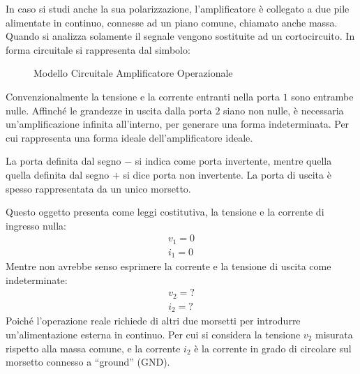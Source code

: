 \documentclass{article}
\numberwithin{equation}{subsection}
\begin{document}
In caso si studi anche la sua polarizzazione, l'amplificatore è collegato a due pile alimentate in continuo, connesse ad un piano comune, chiamato anche massa. Quando si analizza 
solamente il segnale vengono sostituite ad un cortocircuito. 
In forma circuitale si rappresenta dal simbolo:
\begin{figure}[H]
    \centering
    \qquad
    \caption{Modello Circuitale Amplificatore Operazionale}
    \label{fig:op-amp}
\end{figure}

Convenzionalmente la tensione e la corrente entranti nella porta $1$ sono entrambe nulle. Affinché le grandezze in uscita dalla porta $2$ siano non nulle, è necessaria un'amplificazione 
infinita all'interno, per generare una forma indeterminata. Per cui rappresenta una forma ideale dell'amplificatore ideale. 


La porta definita dal segno $-$ si indica come porta invertente, mentre quella quella definita dal segno $+$ si dice porta non invertente. 
La porta di uscita è spesso rappresentata da un unico morsetto. 

Questo oggetto presenta come leggi costitutiva, la tensione e la corrente di ingresso nulla:
\begin{gather*}
    v_1=0\\
    i_1=0
\end{gather*}
Mentre non avrebbe senso esprimere la corrente e la tensione di uscita come indeterminate:
\begin{gather*}
    v_2=?\\
    i_2=?
\end{gather*}
Poiché l'operazione reale richiede di altri due morsetti per introdurre un'alimentazione esterna in continuo. Per cui si considera la tensione $v_2$ 
misurata rispetto alla massa comune, e la corrente $i_2$ è la corrente in grado di circolare sul morsetto connesso a ``ground'' (GND). 
\end{document}
